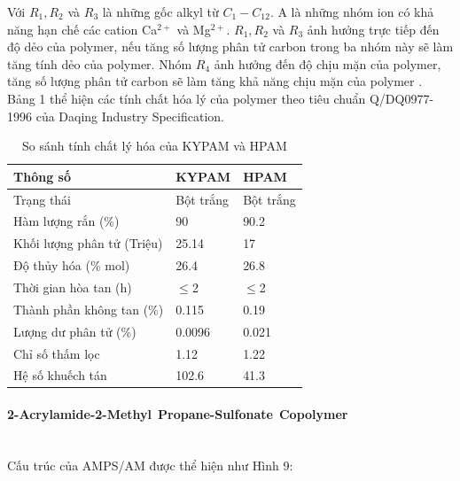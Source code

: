 \documentclass[12pt,a4paper]{article}
\newcommand{\subsubsubsection}[1]{\paragraph{#1}\mbox{}\\}
\begin{document}
	\newline
	Với $R_1, R_2$ và $R_3$ là những gốc alkyl từ $C_1 - C_{12}$. A là những nhóm ion có khả năng hạn chế các cation Ca$^{2+}$ và Mg$^{2+}$. $R_1, R_2$ và $R_3$ ảnh hưởng trực tiếp đến độ dẻo của polymer, nếu tăng số lượng phân tử carbon trong ba nhóm này sẽ làm tăng tính dẻo của polymer. Nhóm $R_4$ ảnh hưởng đến độ chịu mặn của polymer, tăng số lượng phân tử carbon sẽ làm tăng khả năng chịu mặn của polymer \cite{sheng2010modern}. 
	\noindent
	Bảng 1 thể hiện các tính chất hóa lý của polymer theo tiêu chuẩn Q/DQ0977-1996 của Daqing Industry Specification.
\begin{table}[h]
\centering
\caption{So sánh tính chất lý hóa của KYPAM và HPAM \cite{sheng2010modern}}
\label{my-label}
\begin{tabularx}{\textwidth}{@{}XXX@{}}
\toprule
\textbf{Thông số} & \textbf{KYPAM} & \textbf{HPAM} \\ \midrule
Trạng thái                         & Bột trắng                       & Bột trắng                      \\
Hàm lượng rắn (\%)                 & 90                              & 90.2                           \\
Khối lượng phân tử (Triệu)       & 25.14                           & 17                             \\
Độ thủy hóa (\% mol)               & 26.4                            & 26.8                           \\
Thời gian hòa tan (h)              & $\leq$2                         & $\leq$2                        \\
Thành phần không tan (\%)     & 0.115                           & 0.19                           \\
Lượng dư phân tử (\%)             & 0.0096                          & 0.021                          \\
Chỉ số thấm lọc                   & 1.12                            & 1.22                           \\
Hệ số khuếch tán                 & 102.6                           & 41.3                           \\ \bottomrule
\end{tabularx}
\end{table}
	\newpage
	\subsubsubsection{2-Acrylamide-2-Methyl Propane-Sulfonate Copolymer}
	Cấu trúc của AMPS/AM được thể hiện như Hình 9:\\
\end{document}
